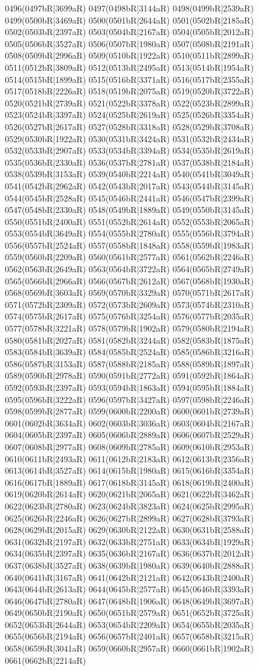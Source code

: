 0496(0497bR|3699aR) 0497(0498bR|3144aR) 0498(0499bR|2539aR) 0499(0500bR|3469aR) 0500(0501bR|2644aR) 0501(0502bR|2185aR) 0502(0503bR|2397aR) 0503(0504bR|2167aR) 0504(0505bR|2012aR) 0505(0506bR|3527aR) 0506(0507bR|1980aR) 0507(0508bR|2191aR) 0508(0509bR|2996aR) 0509(0510bR|1922aR) 0510(0511bR|2899aR) 0511(0512bR|3809aR) 0512(0513bR|2495aR) 0513(0514bR|1954aR) 0514(0515bR|1899aR) 0515(0516bR|3371aR) 0516(0517bR|2355aR) 0517(0518bR|2226aR) 0518(0519bR|2075aR) 0519(0520bR|3722aR) 0520(0521bR|2739aR) 0521(0522bR|3378aR) 0522(0523bR|2899aR) 0523(0524bR|3397aR) 0524(0525bR|2619aR) 0525(0526bR|3354aR) 0526(0527bR|2617aR) 0527(0528bR|3318aR) 0528(0529bR|3708aR) 0529(0530bR|1922aR) 0530(0531bR|3424aR) 0531(0532bR|2434aR) 0532(0533bR|2907aR) 0533(0534bR|3394aR) 0534(0535bR|2619aR) 0535(0536bR|2330aR) 0536(0537bR|2781aR) 0537(0538bR|2184aR) 0538(0539bR|3153aR) 0539(0540bR|2214aR) 0540(0541bR|3049aR) 0541(0542bR|2962aR) 0542(0543bR|2017aR) 0543(0544bR|3145aR) 0544(0545bR|2528aR) 0545(0546bR|2441aR) 0546(0547bR|2399aR) 0547(0548bR|2330aR) 0548(0549bR|1889aR) 0549(0550bR|3145aR) 0550(0551bR|2400aR) 0551(0552bR|2614aR) 0552(0553bR|2065aR) 0553(0554bR|3649aR) 0554(0555bR|2780aR) 0555(0556bR|3794aR) 0556(0557bR|2524aR) 0557(0558bR|1848aR) 0558(0559bR|1983aR) 0559(0560bR|2209aR) 0560(0561bR|2577aR) 0561(0562bR|2246aR) 0562(0563bR|2649aR) 0563(0564bR|3722aR) 0564(0565bR|2749aR) 0565(0566bR|2966aR) 0566(0567bR|2612aR) 0567(0568bR|1930aR) 0568(0569bR|3603aR) 0569(0570bR|3329aR) 0570(0571bR|2617aR) 0571(0572bR|2309aR) 0572(0573bR|2609aR) 0573(0574bR|2310aR) 0574(0575bR|2617aR) 0575(0576bR|3254aR) 0576(0577bR|2035aR) 0577(0578bR|3221aR) 0578(0579bR|1902aR) 0579(0580bR|2194aR) 0580(0581bR|2027aR) 0581(0582bR|3244aR) 0582(0583bR|1875aR) 0583(0584bR|3639aR) 0584(0585bR|2524aR) 0585(0586bR|3216aR) 0586(0587bR|3153aR) 0587(0588bR|2185aR) 0588(0589bR|1897aR) 0589(0590bR|2978aR) 0590(0591bR|2772aR) 0591(0592bR|1864aR) 0592(0593bR|2397aR) 0593(0594bR|1863aR) 0594(0595bR|1884aR) 0595(0596bR|3222aR) 0596(0597bR|3427aR) 0597(0598bR|2246aR) 0598(0599bR|2877aR) 0599(0600bR|2200aR) 0600(0601bR|2739aR) 0601(0602bR|3634aR) 0602(0603bR|3036aR) 0603(0604bR|2167aR) 0604(0605bR|2397aR) 0605(0606bR|2889aR) 0606(0607bR|2529aR) 0607(0608bR|2977aR) 0608(0609bR|2785aR) 0609(0610bR|2953aR) 0610(0611bR|2493aR) 0611(0612bR|2183aR) 0612(0613bR|2356aR) 0613(0614bR|3527aR) 0614(0615bR|1980aR) 0615(0616bR|3354aR) 0616(0617bR|1889aR) 0617(0618bR|3145aR) 0618(0619bR|2400aR) 0619(0620bR|2614aR) 0620(0621bR|2065aR) 0621(0622bR|3462aR) 0622(0623bR|2780aR) 0623(0624bR|3823aR) 0624(0625bR|2995aR) 0625(0626bR|2246aR) 0626(0627bR|2899aR) 0627(0628bR|3793aR) 0628(0629bR|2015aR) 0629(0630bR|2122aR) 0630(0631bR|2588aR) 0631(0632bR|2197aR) 0632(0633bR|2751aR) 0633(0634bR|1929aR) 0634(0635bR|2397aR) 0635(0636bR|2167aR) 0636(0637bR|2012aR) 0637(0638bR|3527aR) 0638(0639bR|1980aR) 0639(0640bR|2888aR) 0640(0641bR|3167aR) 0641(0642bR|2121aR) 0642(0643bR|2400aR) 0643(0644bR|2613aR) 0644(0645bR|2577aR) 0645(0646bR|3393aR) 0646(0647bR|2780aR) 0647(0648bR|1906aR) 0648(0649bR|3697aR) 0649(0650bR|2190aR) 0650(0651bR|2579aR) 0651(0652bR|3725aR) 0652(0653bR|2644aR) 0653(0654bR|2209aR) 0654(0655bR|2035aR) 0655(0656bR|2194aR) 0656(0657bR|2401aR) 0657(0658bR|3215aR) 0658(0659bR|3041aR) 0659(0660bR|2957aR) 0660(0661bR|1902aR) 0661(0662bR|2214aR) 